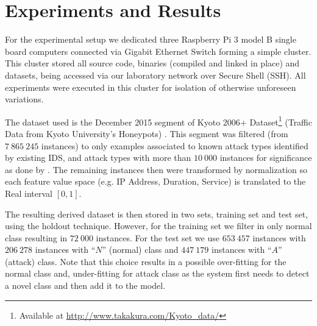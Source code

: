 
\section{Experiments and Results}
\label{sec:experiments}

For the experimental setup we dedicated three Raspberry Pi 3 model B single board computers
connected via Gigabit Ethernet Switch forming a simple cluster.
This cluster stored all source code, binaries (compiled and linked in place) and
datasets, being accessed via our laboratory network over Secure Shell (SSH).
All experiments were executed in this cluster for isolation of otherwise unforeseen
variations.

The dataset used is the December 2015 segment of
Kyoto 2006+ Dataset\footnote{Available at \url{http://www.takakura.com/Kyoto\_data/}}
(Traffic Data from Kyoto University's Honeypots)
\cite{Song2011}.
This segment was filtered (from $7\:865\:245$ instances) to only examples
associated to known attack types identified by existing IDS, and attack types
with more than $10\:000$ instances for significance as done by \cite{Cassales2019a}.
The remaining instances then were transformed by normalization so
each feature value space (e.g. IP Address, Duration, Service) 
is translated to the Real interval $[0, 1]$.

The resulting derived dataset is then stored in two sets,
training set and test set, using the holdout technique.
However, for the training set we filter in only normal class
resulting in $72\:000$ instances.
For the test set we use $653\:457$ instances with
$206\:278$ instances with ``$N$'' (normal) class and
$447\:179$ instances with ``$A$'' (attack) class.
Note that this choice results in a possible over-fitting for the normal class and,
under-fitting for attack class as the system first needs to detect a novel class and
then add it to the model.



